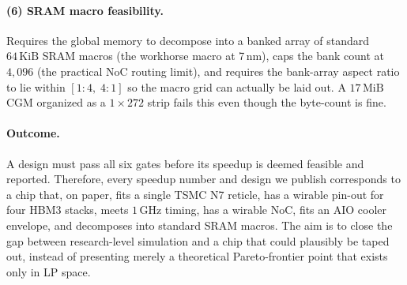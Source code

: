 \paragraph{(6) SRAM macro feasibility.}
Requires the global memory to decompose into a banked array of standard $64\,\mathrm{KiB}$ SRAM macros (the workhorse macro at 7\,nm), caps the bank count at $4{,}096$ (the practical NoC routing limit), and requires the bank-array aspect ratio to lie within $[1{:}4,\; 4{:}1]$ so the macro grid can actually be laid out. A $17\,\mathrm{MiB}$ CGM organized as a $1 \times 272$ strip fails this even though the byte-count is fine.


\paragraph{Outcome.} A design must pass all six gates before its speedup is deemed feasible and reported.
Therefore, every speedup number and design we publish corresponds to a chip that, on paper, fits a single TSMC N7 reticle, has a wirable pin-out for four HBM3 stacks, meets $1\,\mathrm{GHz}$ timing, has a wirable NoC, fits an AIO cooler envelope, and decomposes into standard SRAM macros. The aim is to close the gap between research-level simulation and a chip that could plausibly be taped out, instead of presenting merely a theoretical Pareto-frontier point that exists only in LP space.



